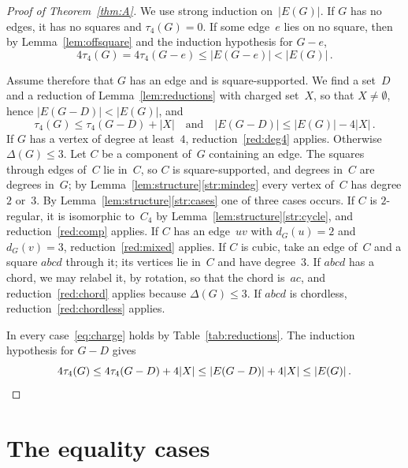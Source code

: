 \documentclass[11pt,letterpaper]{article}
\numberwithin{equation}{section}
\theoremstyle{plain}
\theoremstyle{definition}
\theoremstyle{remark}
\begin{document}
\begin{proof}[Proof of Theorem~\ref{thm:A}]
We use strong induction on~$|E(G)|$. If $G$ has no edges, it has no squares and $\tau_4(G)=0$. If some edge~$e$ lies on no square, then by Lemma~\ref{lem:offsquare} and the induction hypothesis for $G-e$,
\begin{equation*}
4\tau_4(G)=4\tau_4(G-e)\le|E(G-e)|<|E(G)|\,.
\end{equation*}

Assume therefore that $G$ has an edge and is square-supported. We find a set~$D$ and a reduction of Lemma~\ref{lem:reductions} with charged set~$X$, so that $X\neq\emptyset$, hence $|E(G-D)|<|E(G)|$, and
\begin{equation}\label{eq:charge}
\tau_4(G)\le\tau_4(G-D)+|X| \quad \mbox{and} \quad |E(G-D)|\le|E(G)|-4|X|\,.
\end{equation}
If $G$ has a vertex of degree at least~$4$, reduction~\ref{red:deg4} applies. Otherwise $\Delta(G)\le3$. Let $C$ be a component of~$G$ containing an edge. The squares through edges of~$C$ lie in~$C$, so $C$ is square-supported, and degrees in~$C$ are degrees in~$G$; by Lemma~\ref{lem:structure}\ref{str:mindeg} every vertex of~$C$ has degree $2$ or~$3$. By Lemma~\ref{lem:structure}\ref{str:cases} one of three cases occurs. If $C$ is $2$-regular, it is isomorphic to~$C_4$ by Lemma~\ref{lem:structure}\ref{str:cycle}, and reduction~\ref{red:comp} applies. If $C$ has an edge~$uv$ with $d_G(u)=2$ and $d_G(v)=3$, reduction~\ref{red:mixed} applies. If $C$ is cubic, take an edge of~$C$ and a square $abcd$ through it; its vertices lie in~$C$ and have degree~$3$. If $abcd$ has a chord, we may relabel it, by rotation, so that the chord is~$ac$, and reduction~\ref{red:chord} applies because $\Delta(G)\le3$. If $abcd$ is chordless, reduction~\ref{red:chordless} applies.

In every case~\eqref{eq:charge} holds by Table~\ref{tab:reductions}. The induction hypothesis for $G-D$ gives
\begin{equation*}
4\tau_4(G)\le4\tau_4(G-D)+4|X|\le|E(G-D)|+4|X|\le|E(G)|\,. \qedhere
\end{equation*}
\end{proof}

\section{The equality cases}\label{sec:B}
\end{document}
